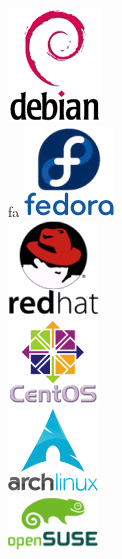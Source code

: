 \documentclass{beamer}
\begin{document}
\begin{frame}
\begin{columns}
\begin{column}{1cm}
\begin{figure}
\includegraphics[scale=0.2]{debian.png}\\fa
\includegraphics[scale=0.2]{fedora.png}\\%
\includegraphics[scale=0.2]{redhat.png}\\%
\includegraphics[scale=0.2]{centos.png}\\
\includegraphics[scale=0.2]{arch.png}\\%
\includegraphics[scale=0.2]{suse.png}\\%
\end{figure}
\end{column}
\end{columns}
\end{frame}
\end{document}

